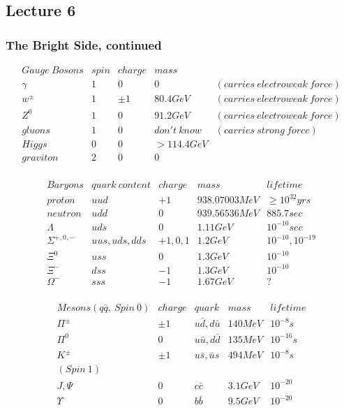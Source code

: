 \documentclass{article}
\begin{document}
\subsection{Lecture 6}

\subsubsection*{ The Bright Side, continued }

$$\begin{matrix} 
Gauge\ Bosons&spin&charge&mass\\
\gamma&1&0&0&(carries\ electroweak\ force)\\
w^\pm&1&\pm 1&80.4 GeV&(carries\ electroweak\ force)\\
Z^0&1&0&91.2 GeV&(carries\ electroweak\ force)\\
gluons&1&0&don't\ know&(carries\ strong\ force)\\
Higgs&0&0&>114.4GeV\\
graviton&2&0&0\\\end{matrix}$$

$$\begin{matrix} 
Baryons&quark\ content&charge&mass&lifetime\\
proton&uud&+1&938.07003 MeV&\ge 10^{32} yrs\\
neutron&udd&0&939.56536 MeV&885.7 sec\\
\Lambda&uds&0&1.11 GeV&10^{-10} sec\\
\Sigma^{+,0,-}&uus,uds,dds&+1,0,1&1.2 GeV&10^{-10}, 10^{-19}\\
\Xi^0&uss&0&1.3 GeV&10^{-10}\\
\Xi^-&dss&-1&1.3 GeV&10^{-10}\\
\Omega^-&sss&-1&1.67 GeV&?\\\end{matrix}$$

$$\begin{matrix} 
Mesons(q\bar q,\ Spin\ 0)&charge&quark&mass&lifetime\\
\Pi^\pm&\pm 1&u\bar d, d\bar u&140MeV&10^{-8}s\\
\Pi^0&0&u\bar u, d\bar d&135MeV&10^{-16}s\\
K^\pm&\pm1&u\bar s,\bar us&494 MeV&10^{-8} s\\
(Spin\ 1)\\
J,\Psi&0&c\bar c&3.1 GeV&10^{-20}\\
\Upsilon&0&b\bar b&9.5 GeV&10^{-20}\\\end{matrix}$$
\end{document}
